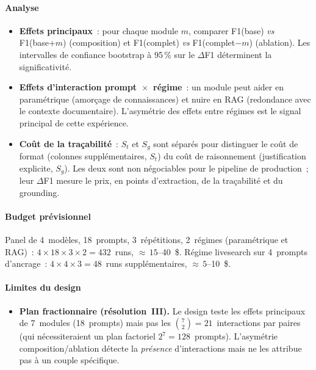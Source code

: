 \paragraph{Analyse}
\begin{itemize}
\item \textbf{Effets principaux}~: pour chaque module $m$, comparer
  F1(base) \emph{vs} F1(base+$m$) (composition) et F1(complet) \emph{vs}
  F1(complet$-m$) (ablation). Les intervalles de confiance bootstrap à
  95\,\% sur le $\Delta$F1 déterminent la significativité.
\item \textbf{Effets d'interaction prompt~$\times$~régime}~: un module peut
  aider en paramétrique (amorçage de connaissances) et nuire en RAG
  (redondance avec le contexte documentaire). L'asymétrie des effets entre
  régimes est le signal principal de cette expérience.
\item \textbf{Coût de la traçabilité}~: $S_t$ et $S_g$ sont séparés pour
  distinguer le coût de format (colonnes supplémentaires, $S_t$) du coût de
  raisonnement (justification explicite, $S_g$). Les deux sont non négociables
  pour le pipeline de production~; leur $\Delta$F1 mesure le prix, en points
  d'extraction, de la traçabilité et du grounding.
\end{itemize}

\paragraph{Budget prévisionnel}

Panel de 4~modèles, 18~prompts, 3~répétitions, 2~régimes (paramétrique et RAG)~:
$4 \times 18 \times 3 \times 2 = 432$~runs, ${\approx}\,15$--40~\$.
Régime livesearch sur 4~prompts d'ancrage~:
$4 \times 4 \times 3 = 48$~runs supplémentaires, ${\approx}\,5$--10~\$.

\paragraph{Limites du design}

\begin{itemize}
\item \textbf{Plan fractionnaire (résolution~III).} Le design teste les
  effets principaux de 7~modules (18~prompts) mais pas les
  $\binom{7}{2}=21$~interactions par paires (qui nécessiteraient un plan
  factoriel $2^7=128$~prompts). L'asymétrie composition/ablation détecte la
  \emph{présence} d'interactions mais ne les attribue pas à un couple
  spécifique.
\end{itemize}

